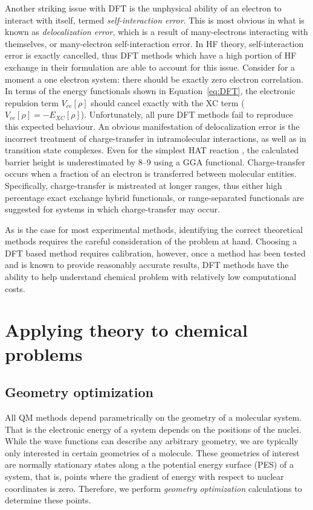 Another striking issue with DFT is the unphysical ability of an electron to interact with itself, termed \emph{self-interaction error}. This is most obvious in what is known as \emph{delocalization error}, which is a result of many-electrons interacting with themselves, or many-electron self-interaction error. In HF theory, self-interaction error is exactly cancelled, thus DFT methods which have a high portion of HF exchange in their formulation are able to account for this issue. Consider for a moment a one electron system: there should be exactly zero electron correlation. In terms of the energy functionals shown in Equation~\ref{eq:DFT}, the electronic repulsion term $V_{ee}[\rho]$ should cancel exactly with the XC term ($V_{ee}[\rho] = -E_{XC}[\rho]$).\cite{Cramer2004} Unfortunately, all pure DFT methods fail to reproduce this expected behaviour. An obvious manifestation of delocalization error is the incorrect treatment of charge-transfer in intramolecular interactions,\cite{MoriSanchez2008,OterodelaRoza2014} as well as in transition state complexes. Even for the simplest HAT reaction , the calculated barrier height is underestimated by 8--9 \kcalmol using a GGA functional.\cite{Csonka1998} Charge-transfer occurs when a fraction of an electron is transferred between molecular entities. Specifically, charge-transfer is mistreated at longer ranges, thus either high percentage exact exchange hybrid functionals, or range-separated functionals are suggested for systems in which charge-transfer may occur.

As is the case for most experimental methods, identifying the correct theoretical methods requires the careful consideration of the problem at hand. Choosing a DFT based method requires calibration, however, once a method has been tested and is known to provide reasonably accurate results, DFT methods have the ability to help understand chemical problem with relatively low computational costs.

\section{Applying theory to chemical problems}

\subsection{Geometry optimization}

All QM methods depend parametrically on the geometry of a molecular system. That is the electronic energy of a system depends on the positions of the nuclei. While the wave functions can describe any arbitrary geometry, we are typically only interested in certain geometries of a molecule. These geometries of interest are normally stationary states along a the potential energy surface (PES) of a system, that is, points where the gradient of energy with respect to nuclear coordinates is zero. Therefore, we perform \emph{geometry optimization} calculations to determine these points.

